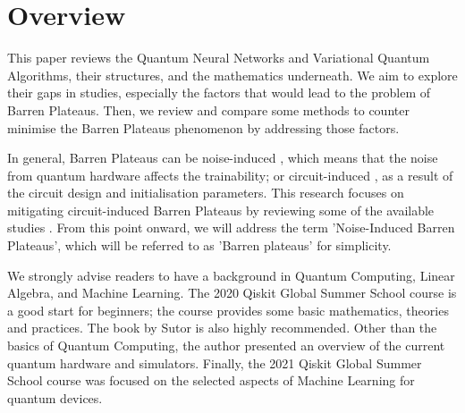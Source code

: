 \section{Overview}
This paper reviews the Quantum Neural Networks and Variational Quantum Algorithms, their structures, and the mathematics underneath. 
We aim to explore their gaps in studies, especially the factors that would lead to the problem of Barren Plateaus.
Then, we review and compare some methods to counter minimise the Barren Plateaus phenomenon by addressing those factors.

In general, Barren Plateaus can be noise-induced \cite{wangNoiseinducedBarrenPlateaus2021}, which means that the noise from quantum hardware affects the trainability; 
or circuit-induced \cite{mccleanBarrenPlateausQuantum2018}, as a result of the circuit design and initialisation parameters.
This research focuses on mitigating circuit-induced Barren Plateaus by reviewing some of the available studies \cite{pesahAbsenceBarrenPlateaus2021, cerezoCostFunctionDependent2021, skolikLayerwiseLearningQuantum2021}.
From this point onward, we will address the term 'Noise-Induced Barren Plateaus', which will be referred to as 'Barren plateaus' for simplicity.

We strongly advise readers to have a background in Quantum Computing, Linear Algebra, and Machine Learning. 
The 2020 Qiskit Global Summer School course \cite{2020QiskitGlobal} is a good start for beginners; the course provides some basic mathematics, theories and practices. 
The book by Sutor \cite{sutorDancingQubitsHow2019} is also highly recommended. 
Other than the basics of Quantum Computing, the author presented an overview of the current quantum hardware and simulators.
Finally, the 2021 Qiskit Global Summer School course \cite{2021QiskitGlobal} was focused on the selected aspects of Machine Learning for quantum devices.